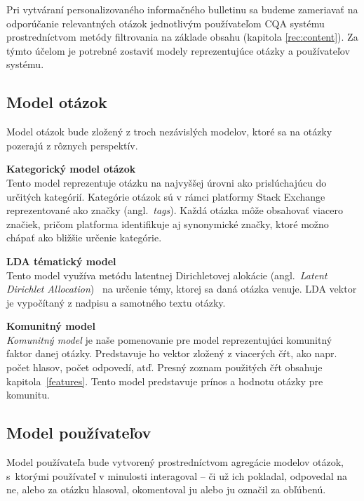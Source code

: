 Pri vytváraní personalizovaného informačného bulletinu sa budeme zameriavať na odporúčanie relevantných otázok jednotlivým
používateľom CQA systému prostredníctvom metódy filtrovania na základe obsahu (kapitola \ref{rec:content}). Za týmto účelom
je potrebné zostaviť modely reprezentujúce otázky a používateľov systému.

\subsection{Model otázok}

Model otázok bude zložený z troch nezávislých modelov, ktoré sa na otázky pozerajú z rôznych perspektív.

\begin{my_enumerate}
\item{\textbf{Kategorický model otázok}\\
Tento model reprezentuje otázku na najvyššej úrovni ako prislúchajúcu do určitých kategórií. Kategórie otázok sú v rámci
platformy Stack Exchange reprezentované ako značky (angl.~\emph{tags}). Každá otázka môže obsahovať viacero značiek, pričom
platforma identifikuje aj synonymické značky, ktoré možno chápať ako bližšie určenie kategórie.}

\item{\textbf{LDA tématický model}\\
Tento model využíva metódu latentnej Dirichletovej alokácie (angl.~\emph{Latent Dirichlet Allocation})~\cite{blei2003latent}
na určenie témy, ktorej sa daná otázka venuje. LDA vektor je vypočítaný z nadpisu a samotného textu otázky.}

\item{\textbf{Komunitný model}\\
\textit{Komunitný model} je naše pomenovanie pre model reprezentujúci komunitný faktor danej otázky. Predstavuje ho vektor
zložený z viacerých čŕt, ako napr. počet hlasov, počet odpovedí, atď. Presný zoznam použitých čŕt obsahuje
kapitola~\ref{features}. Tento model predstavuje prínos a hodnotu otázky pre komunitu.}
\end{my_enumerate}


\subsection{Model používateľov}

Model používateľa bude vytvorený prostredníctvom agregácie modelov otázok, s~ktorými používateľ v minulosti interagoval
-- či už ich pokladal, odpovedal na ne, alebo za otázku hlasoval, okomentoval ju alebo ju označil za obľúbenú.

